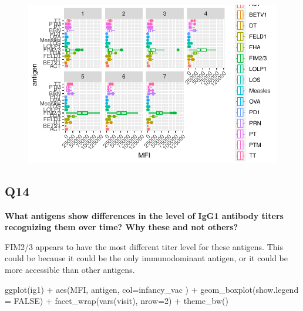 \documentclass[
  letterpaper,
  DIV=11,
  numbers=noendperiod]{scrartcl}
\newenvironment{Shaded}{\begin{snugshade}}{\end{snugshade}}
\newcommand{\AttributeTok}[1]{\textcolor[rgb]{0.40,0.45,0.13}{#1}}
\newcommand{\ConstantTok}[1]{\textcolor[rgb]{0.56,0.35,0.01}{#1}}
\newcommand{\DecValTok}[1]{\textcolor[rgb]{0.68,0.00,0.00}{#1}}
\newcommand{\FunctionTok}[1]{\textcolor[rgb]{0.28,0.35,0.67}{#1}}
\newcommand{\NormalTok}[1]{\textcolor[rgb]{0.00,0.23,0.31}{#1}}
\newcommand{\SpecialCharTok}[1]{\textcolor[rgb]{0.37,0.37,0.37}{#1}}
\begin{document}
\begin{figure}[H]

{\centering \includegraphics{Class19_files/figure-pdf/unnamed-chunk-23-1.pdf}

}

\end{figure}

\hypertarget{q14}{%
\subsection{Q14}\label{q14}}

\textbf{What antigens show differences in the level of IgG1 antibody
titers recognizing them over time? Why these and not others?}

FIM2/3 appears to have the most different titer level for these
antigens. This could be because it could be the only immunodominant
antigen, or it could be more accessible than other antigens.

\begin{Shaded}
\begin{Highlighting}[]
\FunctionTok{ggplot}\NormalTok{(ig1) }\SpecialCharTok{+}
  \FunctionTok{aes}\NormalTok{(MFI, antigen, }\AttributeTok{col=}\NormalTok{infancy\_vac ) }\SpecialCharTok{+}
  \FunctionTok{geom\_boxplot}\NormalTok{(}\AttributeTok{show.legend =} \ConstantTok{FALSE}\NormalTok{) }\SpecialCharTok{+} 
  \FunctionTok{facet\_wrap}\NormalTok{(}\FunctionTok{vars}\NormalTok{(visit), }\AttributeTok{nrow=}\DecValTok{2}\NormalTok{) }\SpecialCharTok{+}
  \FunctionTok{theme\_bw}\NormalTok{()}
\end{Highlighting}
\end{Shaded}
\end{document}
